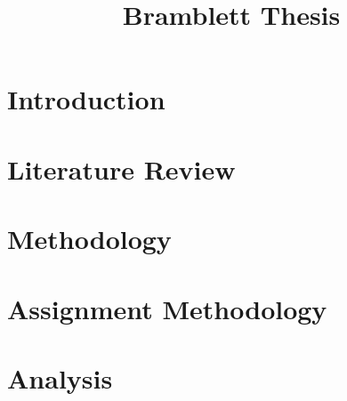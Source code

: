 \documentclass[12pt,letterpaper,oneside]{book}
\title{Bramblett Thesis}
\theoremstyle{definition}
\begin{document}
\frontmatter
	\flyleaf
    \disclaimerpage
    \titlepageAFIT
    \committeepage
    
    
    \tableofcontents
    \listoffigures
    \listoftables
\mainmatter
	\chapter{Introduction}
	
    \chapter{Literature Review}
    
    \chapter{Methodology}
    
    \chapter{Assignment Methodology}
    
    \chapter{Analysis}
    
    \appendix
    
\backmatter
	\singlespace
	
	 
	\clearpage
%
\end{document}
